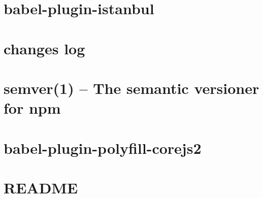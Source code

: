 \documentclass[twoside]{book}
\newcommand{\+}{\discretionary{\mbox{\scriptsize$\hookleftarrow$}}{}{}}
\begin{document}
\chapter{babel-\/plugin-\/istanbul}
\label{md__c___users_vaishnavi_jadhav__desktop__developer_code_mean_stack_example_client_node_modules_b56984592d9e09b1a68efe4cd0232b986}

\chapter{changes log}
\label{md__c___users_vaishnavi_jadhav__desktop__developer_code_mean_stack_example_client_node_modules_ba86c13ba2522fea2a1f97884d11a5674}

\chapter{semver(1) -- The semantic versioner for npm}
\label{md__c___users_vaishnavi_jadhav__desktop__developer_code_mean_stack_example_client_node_modules_b934f521348e7285ee9d94cc450c6cf1e}

\chapter{babel-\/plugin-\/polyfill-\/corejs2}
\label{md__c___users_vaishnavi_jadhav__desktop__developer_code_mean_stack_example_client_node_modules_b9ffff3690c63440f89bc63c37f56d78e}

\chapter{README}
\label{md__c___users_vaishnavi_jadhav__desktop__developer_code_mean_stack_example_client_node_modules_b9c1de24e7f08ef5272c9474c25242b65}

\end{document}
